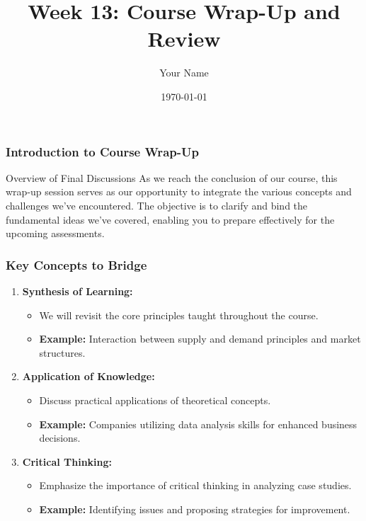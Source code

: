 \documentclass{beamer}
\title{Week 13: Course Wrap-Up and Review}
\author{Your Name}
\institute{Your Institution}
\date{\today}
\begin{document}
\frame{\titlepage}

\begin{frame}[fragile]
    \frametitle{Introduction to Course Wrap-Up}
    \begin{block}{Overview of Final Discussions}
        As we reach the conclusion of our course, this wrap-up session serves as our opportunity to integrate the various concepts and challenges we've encountered. The objective is to clarify and bind the fundamental ideas we've covered, enabling you to prepare effectively for the upcoming assessments.
    \end{block}
\end{frame}

\begin{frame}[fragile]
    \frametitle{Key Concepts to Bridge}
    \begin{enumerate}
        \item \textbf{Synthesis of Learning:}
            \begin{itemize}
                \item We will revisit the core principles taught throughout the course.
                \item \textbf{Example:} Interaction between supply and demand principles and market structures.
            \end{itemize}
            
        \item \textbf{Application of Knowledge:}
            \begin{itemize}
                \item Discuss practical applications of theoretical concepts.
                \item \textbf{Example:} Companies utilizing data analysis skills for enhanced business decisions.
            \end{itemize}
        
        \item \textbf{Critical Thinking:}
            \begin{itemize}
                \item Emphasize the importance of critical thinking in analyzing case studies.
                \item \textbf{Example:} Identifying issues and proposing strategies for improvement.
            \end{itemize}
    \end{enumerate}
\end{frame}
\end{document}
